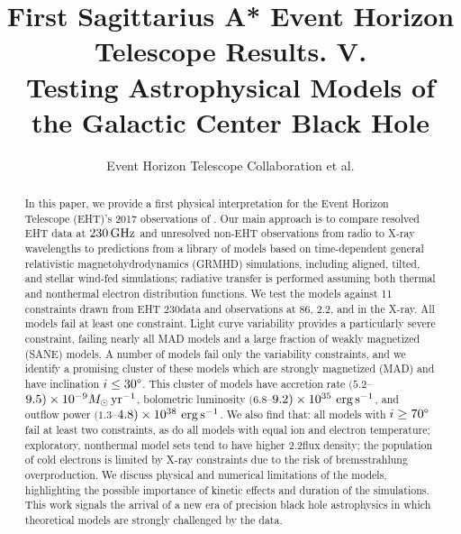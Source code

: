 \documentclass[twocolumn,twocolappendix,tighten,dvipsnames,linenumbers]{aastex63}
\begin{document}
\title{First Sagittarius A* Event Horizon Telescope Results. V.\\
  Testing Astrophysical Models of the Galactic Center Black Hole}

%
\author{Event Horizon Telescope Collaboration et al.}


\received{\today}
\revised{\today}

\begin{abstract}
  In this paper, we provide a first physical interpretation for the Event Horizon Telescope (EHT)'s 2017 observations of \sgra.
  Our main approach is to compare resolved EHT data at $230\,\mathrm{GHz}$ and unresolved non-EHT observations from radio to X-ray wavelengths to predictions from a library of models based on time-dependent general relativistic magnetohydrodynamics (GRMHD) simulations, including aligned, tilted, and stellar wind-fed simulations; radiative transfer is performed assuming both thermal and nonthermal electron distribution functions. We test the models against 11 constraints drawn from EHT 230\GHz data and observations at 86\GHz, 2.2\um, and in the X-ray.
  All models fail at least one constraint.
  Light curve variability provides a particularly severe constraint, failing nearly all MAD models and a large fraction of weakly magnetized (SANE) models.
  A number of models fail only the variability constraints, and we identify a promising cluster of these models which are strongly magnetized (MAD) and have inclination $i \le 30\degree$.
  This cluster of models have accretion rate $(5.2$--$9.5)\times10^{-9}M_\odot\,\mathrm{yr}^{-1}$, bolometric luminosity $(6.8$--$9.2)\times10^{35}\,\,\mathrm{erg}\,\mathrm{s}^{-1}$, and outflow power $(1.3$--$4.8)\times10^{38}\,\,\mathrm{erg}\,\mathrm{s}^{-1}$.
  We also find that: all models with $i \ge 70\degree$ fail at least two constraints, as do all models with equal ion and electron temperature;  exploratory, nonthermal model sets tend to have higher 2.2\um flux density; the population of cold electrons is limited by X-ray constraints due to the risk of bremsstrahlung overproduction.
  We discuss physical and numerical limitations of the models, highlighting the possible importance of kinetic effects and duration of the simulations.
  This work signals the arrival of a new era of precision black hole astrophysics in which theoretical models are strongly challenged by the data.
\end{abstract}
\end{document}
